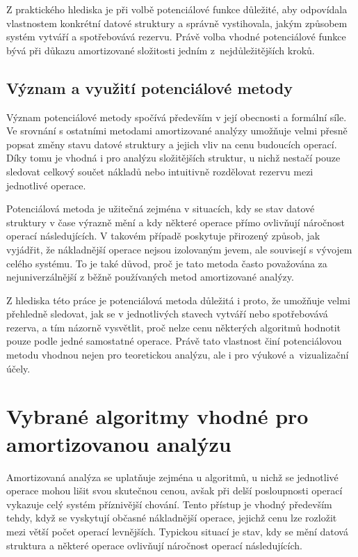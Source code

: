 Z praktického hlediska je při volbě potenciálové funkce důležité, aby odpovídala vlastnostem konkrétní datové struktury a správně vystihovala, jakým způsobem systém vytváří a spotřebovává rezervu. Právě volba vhodné potenciálové funkce bývá při důkazu amortizované složitosti jedním z~nejdůležitějších kroků.

\subsection{Význam a využití potenciálové metody}
Význam potenciálové metody spočívá především v její obecnosti a formální síle. Ve srovnání s ostatními metodami amortizované analýzy umožňuje velmi přesně popsat změny stavu datové struktury a jejich vliv na cenu budoucích operací. Díky tomu je vhodná i pro analýzu složitějších struktur, u nichž nestačí pouze sledovat celkový součet nákladů nebo intuitivně rozdělovat rezervu mezi jednotlivé operace.

Potenciálová metoda je užitečná zejména v situacích, kdy se stav datové struktury v čase výrazně mění a kdy některé operace přímo ovlivňují náročnost operací následujících. V takovém případě poskytuje přirozený způsob, jak vyjádřit, že nákladnější operace nejsou izolovaným jevem, ale souvisejí s vývojem celého systému. To je také důvod, proč je tato metoda často považována za nejuniverzálnější z běžně používaných metod amortizované analýzy.

Z hlediska této práce je potenciálová metoda důležitá i proto, že umožňuje velmi přehledně sledovat, jak se v jednotlivých stavech vytváří nebo spotřebovává rezerva, a tím názorně vysvětlit, proč nelze cenu některých algoritmů hodnotit pouze podle jedné samostatné operace. Právě tato vlastnost činí potenciálovou metodu vhodnou nejen pro teoretickou analýzu, ale i pro výukové a~vizualizační účely.


\section{Vybrané algoritmy vhodné pro amortizovanou analýzu}
Amortizovaná analýza se uplatňuje zejména u algoritmů, u nichž se jednotlivé operace mohou lišit svou skutečnou cenou, avšak při delší posloupnosti operací vykazuje celý systém příznivější chování. Tento přístup je vhodný především tehdy, když se vyskytují občasné nákladnější operace, jejichž cenu lze rozložit mezi větší počet operací levnějších. Typickou situací je stav, kdy se mění datová struktura a některé operace ovlivňují náročnost operací následujících.

